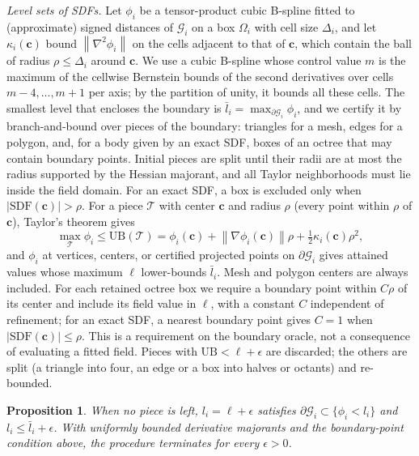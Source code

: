 \documentclass[journal]{IEEEtran}
\newtheorem{proposition}{Proposition}
\theoremstyle{definition}
\newcommand{\norm}[1]{\left\lVert #1\right\rVert}
\begin{document}
\emph{Level sets of SDFs.} Let $\phi_i$ be a tensor-product cubic B-spline fitted to (approximate)
signed distances of $\mathcal G_i$ on a box $\Omega_i$ with cell size $\Delta_i$, and let
$\kappa_i(\mathbf c)$ bound $\norm{\nabla^2\phi_i}$ on the cells adjacent to that of $\mathbf c$, which
contain the ball of radius $\rho\le\Delta_i$ around $\mathbf c$. We use a cubic B-spline whose control
value $m$ is the maximum of the cellwise Bernstein bounds of the second derivatives over cells
$m-4,\dots,m+1$ per axis; by the partition of unity, it bounds all these cells. The smallest level that encloses the boundary is
$\bar l_i=\max_{\partial\mathcal G_i}\phi_i$, and we certify it by branch-and-bound over pieces of the
boundary: triangles for a mesh, edges for a polygon, and, for a body given by an exact SDF, boxes of an
octree that may contain boundary points. Initial pieces are split until their radii are at most
the radius supported by the Hessian majorant, and all Taylor neighborhoods must lie inside the
field domain. For an exact SDF, a box is excluded only when
$|\mathrm{SDF}(\mathbf c)|>\rho$. For a piece $\mathcal T$ with center $\mathbf c$ and radius
$\rho$ (every point within $\rho$ of $\mathbf c$), Taylor's theorem gives
\begin{equation}\label{eq:level-ub}
\max_{\mathcal T}\phi_i\le\mathrm{UB}(\mathcal T)=\phi_i(\mathbf c)+\norm{\nabla\phi_i(\mathbf c)}\rho
+\tfrac12\kappa_i(\mathbf c)\rho^2 ,
\end{equation}
and $\phi_i$ at vertices, centers, or certified projected points on $\partial\mathcal G_i$ gives
attained values whose maximum $\ell$ lower-bounds $\bar l_i$. Mesh and polygon centers are always
included. For each retained octree box we
require a boundary point within $C\rho$ of its center and include its field value in $\ell$,
with a constant $C$ independent of refinement; for an exact SDF, a nearest boundary point gives $C=1$ when
$|\mathrm{SDF}(\mathbf c)|\le\rho$. This is a requirement on the boundary oracle, not a
consequence of evaluating a fitted field. Pieces with $\mathrm{UB}<\ell+\epsilon$ are discarded;
the others are split (a triangle into four, an edge or a box into halves or octants) and re-bounded.
\begin{proposition}\label{prop:level}
When no piece is left, $l_i=\ell+\epsilon$ satisfies $\partial\mathcal G_i\subset\{\phi_i<l_i\}$ and
$l_i\le\bar l_i+\epsilon$. With uniformly bounded derivative majorants and the boundary-point
condition above, the procedure terminates for every $\epsilon>0$.
\end{proposition}
\end{document}
